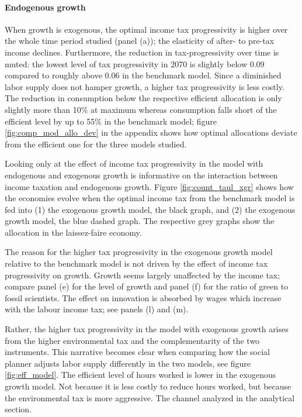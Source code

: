 \paragraph{Endogenous growth}
When growth is exogenous, the optimal income tax progressivity is higher over the whole time period studied (panel (a)); the elasticity of after- to pre-tax income declines. Furthermore, the reduction in tax-progressivity over time is muted: the lowest level of tax progressivity in 2070 is slightly below $0.09$ compared to roughly above $0.06$ in the benchmark model. 
Since a diminished labor supply does not hamper growth, a higher tax progressivity is less costly.  The reduction in consumption below the respective efficient allocation is only slightly more than 10\% at maximum whereas consumption falls short of the efficient level by up to 55\% in the benchmark model; figure \ref{fig:comp_mod_allo_dev} in the appendix shows how optimal allocations deviate from the efficient one for the three models studied.

Looking only at the effect of income tax progressivity in the model with endogenous and exogenous growth is informative on the interaction between income taxation and endogenous growth. 
Figure \ref{fig:count_taul_xgr} shows how the economies evolve when the optimal income tax from the benchmark model is fed into (1) the exogenous growth model, the black graph, and (2) the exogenous growth model, the blue dashed graph. The respective grey graphs show the allocation in the laissez-faire economy.


The reason for the higher tax progressivity in the exogenous growth model relative to the benchmark model is not driven by the effect of income tax progressivity on growth. Growth seems largely unaffected by the income tax; compare panel (e) for the level of growth and panel (f) for the ratio of green to fossil scientists. The effect on innovation is absorbed by wages which increase with the labour income tax; see panels (l) and (m).  

Rather, the higher tax progressivity in the model with exogenous growth arises from the higher environmental tax and the complementarity of the two instruments. This narrative becomes clear when comparing how the social planner adjusts labor supply differently in the two models, see figure \ref{fig:eff_model}. The efficient level of hours worked is lower in the exogenous growth model. Not because it is less costly to reduce hours worked, but because the environmental tax is more aggressive. The channel analyzed in the analytical section.  




